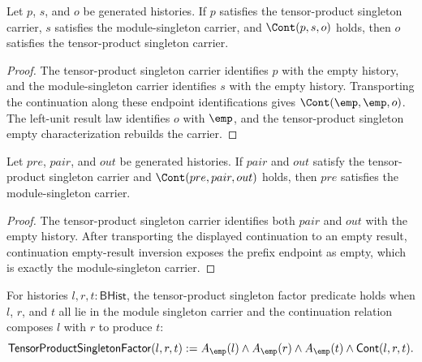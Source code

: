 \begin{theorem}
\label{thm:tensorproduct-singleton-carrier-continuation-result-closed}
Let $p$, $s$, and $o$ be generated histories. If $p$ satisfies the
tensor-product singleton carrier, $s$ satisfies the module-singleton carrier,
and $\Cont(p,s,o)$ holds, then $o$ satisfies the tensor-product singleton carrier.
\end{theorem}
\begin{proof}
The tensor-product singleton carrier identifies $p$ with the empty history,
and the module-singleton carrier identifies $s$ with the empty history.
Transporting the continuation along these endpoint identifications gives
$\Cont(\emp,\emp,o)$. The left-unit result law identifies $o$ with $\emp$,
and the tensor-product singleton empty characterization rebuilds the carrier.
\end{proof}

\begin{theorem}
\label{thm:tensorproduct-singleton-carrier-continuation-prefix-carrier}
Let $pre$, $pair$, and $out$ be generated histories. If $pair$ and $out$
satisfy the tensor-product singleton carrier and $\Cont(pre,pair,out)$ holds,
then $pre$ satisfies the module-singleton carrier.
\end{theorem}
\begin{proof}
The tensor-product singleton carrier identifies both $pair$ and $out$ with
the empty history. After transporting the displayed continuation to an empty
result, continuation empty-result inversion exposes the prefix endpoint as
empty, which is exactly the module-singleton carrier.
\end{proof}

\begin{definition}
\label{def:tensorproduct-singleton-factor}
For histories $l,r,t:\mathsf{BHist}$, the tensor-product singleton factor
predicate holds when $l$, $r$, and $t$ all lie in the module singleton carrier
and the continuation relation composes $l$ with $r$ to produce $t$:
$$
\mathsf{TensorProductSingletonFactor}(l,r,t)
:=
A_{\emp}(l)\land A_{\emp}(r)\land A_{\emp}(t)\land
\mathsf{Cont}(l,r,t).
$$
\end{definition}

